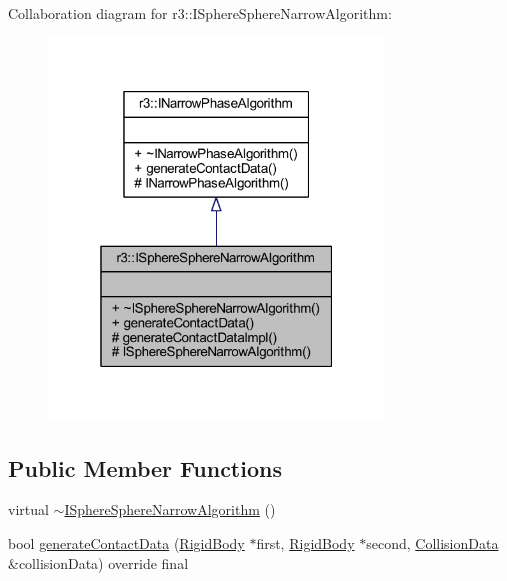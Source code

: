 Collaboration diagram for r3\+:\+:I\+Sphere\+Sphere\+Narrow\+Algorithm\+:\nopagebreak
\begin{figure}[H]
\begin{center}
\leavevmode
\includegraphics[width=253pt]{classr3_1_1_i_sphere_sphere_narrow_algorithm__coll__graph}
\end{center}
\end{figure}
\subsection*{Public Member Functions}
\begin{DoxyCompactItemize}
\item 
virtual \mbox{\hyperlink{classr3_1_1_i_sphere_sphere_narrow_algorithm_af1abc65f80b07e3af1d3b1c69d6b5db0}{$\sim$\+I\+Sphere\+Sphere\+Narrow\+Algorithm}} ()
\item 
bool \mbox{\hyperlink{classr3_1_1_i_sphere_sphere_narrow_algorithm_acfdb8ae3db8c91843216651768cbd4e2}{generate\+Contact\+Data}} (\mbox{\hyperlink{classr3_1_1_rigid_body}{Rigid\+Body}} $\ast$first, \mbox{\hyperlink{classr3_1_1_rigid_body}{Rigid\+Body}} $\ast$second, \mbox{\hyperlink{classr3_1_1_collision_data}{Collision\+Data}} \&collision\+Data) override final
\end{DoxyCompactItemize}
